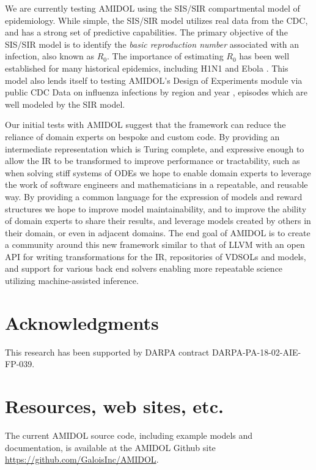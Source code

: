 \documentclass[11pt]{article}
\newcommand{\amidol}{\textsc{AMIDOL}}
\begin{document}
We are currently testing \amidol{} using the SIS/SIR compartmental model of epidemiology.  While simple, the SIS/SIR model utilizes real data from the CDC, and has a strong set of predictive capabilities.  The primary objective of the SIS/SIR model is to identify the \emph{basic reproduction number} associated with an infection, also known as $R_0$. The importance of estimating $R_0$ has been well established for many historical epidemics, including H1N1 \cite{fraser2009pandemic} and Ebola \cite{fisman2014early}.  This model also lends itself to testing \amidol{}'s Design of Experiments module via public CDC Data on influenza infections by region and year \cite{cdc2019fluview}, episodes which are well modeled by the SIR model.

Our initial tests with \amidol{} suggest that the framework can reduce the reliance of domain experts on bespoke and custom code.  By providing an intermediate representation which is Turing complete, and expressive enough to allow the IR to be transformed to improve performance or tractability, such as when solving stiff systems of ODEs \cite{enright1975comparing} we hope to enable domain experts to leverage the work of software engineers and mathematicians in a repeatable, and reusable way.  By providing a common language for the expression of models and reward structures we hope to improve model maintainability, and to improve the ability of domain experts to share their results, and leverage models created by others in their domain, or even in adjacent domains.  The end goal of \amidol{} is to create a community around this new framework similar to that of LLVM \cite{lattner2004llvm} with an open API for writing transformations for the IR, repositories of VDSOLs and models, and support for various back end solvers enabling more repeatable science utilizing machine-assisted inference.

\section{Acknowledgments}

This research has been supported by DARPA contract DARPA-PA-18-02-AIE-FP-039.

\section{Resources, web sites, etc.}

The current \amidol{} source code, including example models and documentation, is available at the \amidol{} Github site \url{https://github.com/GaloisInc/AMIDOL}.



\end{document}

